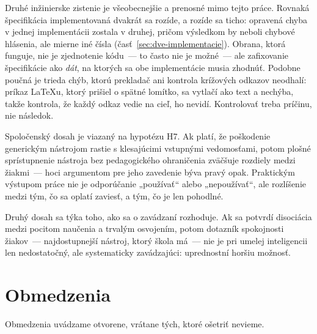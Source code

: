 Druhé inžinierske zistenie je všeobecnejšie a prenosné mimo tejto práce. Rovnaká špecifikácia implementovaná dvakrát sa rozíde, a rozíde sa ticho: opravená chyba v jednej implementácii zostala v druhej, pričom výsledkom by neboli chybové hlásenia, ale mierne iné čísla (časť~\ref{sec:dve-implementacie}). Obrana, ktorá funguje, nie je zjednotenie kódu~--- to často nie je možné~--- ale zafixovanie špecifikácie ako \emph{dát}, na ktorých sa obe implementácie musia zhodnúť. Podobne poučná je trieda chýb, ktorú prekladač ani kontrola krížových odkazov neodhalí: príkaz \LaTeX{}u, ktorý prišiel o spätné lomítko, sa vytlačí ako text a nechýba, takže kontrola, že každý odkaz vedie na cieľ, ho nevidí. Kontrolovať treba príčinu, nie následok.

Spoločenský dosah je viazaný na hypotézu H7. Ak platí, že poškodenie generickým nástrojom rastie s klesajúcimi vstupnými vedomosťami, potom plošné sprístupnenie nástroja bez pedagogického ohraničenia zväčšuje rozdiely medzi žiakmi~--- hoci argumentom pre jeho zavedenie býva pravý opak. Praktickým výstupom práce nie je odporúčanie „používať“ alebo „nepoužívať“, ale rozlíšenie medzi tým, čo sa oplatí zaviesť, a tým, čo je len pohodlné.

Druhý dosah sa týka toho, ako sa o zavádzaní rozhoduje. Ak sa potvrdí disociácia medzi pocitom naučenia a trvalým osvojením, potom dotazník spokojnosti žiakov~--- najdostupnejší nástroj, ktorý škola má~--- nie je pri umelej inteligencii len nedostatočný, ale systematicky zavádzajúci: uprednostní horšiu možnosť.

\section{Obmedzenia}

Obmedzenia uvádzame otvorene, vrátane tých, ktoré ošetriť nevieme.

